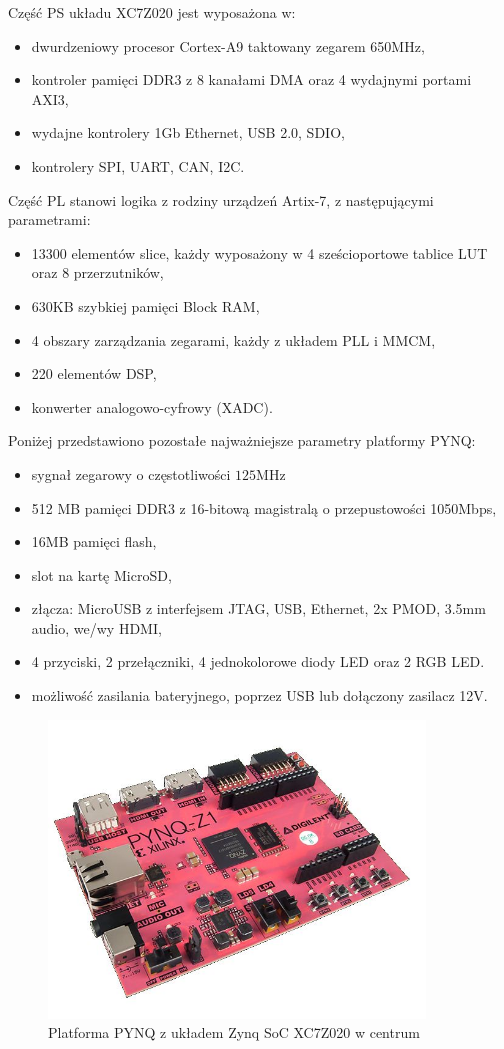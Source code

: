 Część PS układu XC7Z020 jest wyposażona w:
\begin{itemize}
	\item dwurdzeniowy procesor Cortex-A9 taktowany zegarem 650MHz,
	\item kontroler pamięci DDR3 z 8 kanałami DMA oraz 4 wydajnymi portami AXI3,
	\item wydajne kontrolery 1Gb Ethernet, USB 2.0, SDIO,
	\item kontrolery SPI, UART, CAN, I2C.
\end{itemize}
Część PL stanowi logika z rodziny urządzeń Artix-7, z następującymi parametrami:
\begin{itemize}
	\item 13300 elementów slice, każdy wyposażony w 4 sześcioportowe tablice LUT oraz 8 przerzutników,
	\item 630KB szybkiej pamięci Block RAM,
	\item 4 obszary zarządzania zegarami, każdy z układem PLL i MMCM,
	\item 220 elementów DSP,
	\item konwerter analogowo-cyfrowy (XADC).
\end{itemize}

Poniżej przedstawiono pozostałe najważniejsze parametry platformy PYNQ:
\begin{itemize}
	\item sygnał zegarowy o częstotliwości $125$MHz
	\item 512 MB pamięci DDR3 z 16-bitową magistralą o przepustowości 1050Mbps,
	\item 16MB pamięci flash,
	\item slot na kartę MicroSD,
	\item złącza: MicroUSB z interfejsem JTAG, USB, Ethernet, 2x PMOD, 3.5mm audio, we/wy HDMI,
	\item 4 przyciski, 2 przełączniki, 4 jednokolorowe diody LED oraz 2 RGB LED.
	\item możliwość zasilania bateryjnego, poprzez USB lub dołączony zasilacz 12V.
\end{itemize}

\begin{figure}[h]
	\centering
	\includegraphics[width=10cm]{4_PYNQ.jpg}
	\caption{Platforma PYNQ z układem Zynq SoC XC7Z020 w centrum}
	\label{fig:PYNQ}
\end{figure}

